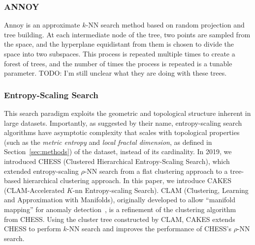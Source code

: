 \subsubsection{ANNOY}
\label{sec:introduction:related-works:annoy}

Annoy is an approximate $k$-NN search method based on random projection and tree building.
At each intermediate node of the tree, two points are sampled from the space, and the hyperplane equidistant from them is chosen to divide the space into two subspaces.
This process is repeated multiple times to create a forest of trees, and the number of times the process is repeated is a tunable parameter.
{\color{red} TODO: I'm still unclear what they are doing with these trees.}

\subsubsection{Entropy-Scaling Search}
\label{sec:introduction:related-works:entropy-scaling-search}

This search paradigm exploits the geometric and topological structure inherent in large datasets.
Importantly, as suggested by their name, entropy-scaling search algorithms have asymptotic complexity that scales with topological properties (such as the \emph{metric entropy} and \emph{local fractal dimension}, as defined in Section~\ref{sec:methods}) of the dataset, instead of its cardinality.
In 2019, we introduced CHESS (Clustered Hierarchical Entropy-Scaling Search), which extended entropy-scaling $\rho$-NN search from a flat clustering approach to a tree-based hierarchical clustering approach.
In this paper, we introduce CAKES (CLAM-Accelerated $K$-nn Entropy-scaling Search).
CLAM (Clustering, Learning and Approximation with Manifolds), originally developed to allow ``manifold mapping'' for anomaly detection~\cite{ishaq2021clustered}, is a refinement of the clustering algorithm from CHESS.
Using the cluster tree constructed by CLAM, CAKES extends CHESS to perform $k$-NN search and improves the performance of CHESS's $\rho$-NN search.
